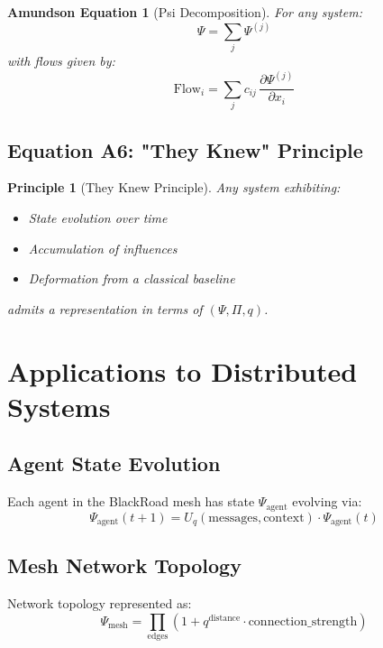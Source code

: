 \documentclass[12pt,a4paper]{article}
\newtheorem{principle}{Principle}
\newtheorem{equation_amundson}{Amundson Equation}
\begin{document}
\begin{equation_amundson}[Psi Decomposition]
For any system:
\begin{equation}\label{eq:a5}
\Psi = \sum_{j} \Psi^{(j)}
\end{equation}
with flows given by:
\begin{equation}
\text{Flow}_i = \sum_j c_{ij}\, \frac{\partial \Psi^{(j)}}{\partial x_i}
\end{equation}
\end{equation_amundson}

\subsection{Equation A6: "They Knew" Principle}

\begin{principle}[They Knew Principle]
Any system exhibiting:
\begin{itemize}
\item State evolution over time
\item Accumulation of influences
\item Deformation from a classical baseline
\end{itemize}
admits a representation in terms of $(\Psi, \Pi, q)$.
\end{principle}

\section{Applications to Distributed Systems}

\subsection{Agent State Evolution}

Each agent in the BlackRoad mesh has state $\Psi_{\text{agent}}$ evolving via:
\begin{equation}
\Psi_{\text{agent}}(t+1) = U_q(\text{messages}, \text{context}) \cdot \Psi_{\text{agent}}(t)
\end{equation}

\subsection{Mesh Network Topology}

Network topology represented as:
\begin{equation}
\Psi_{\text{mesh}} = \prod_{\text{edges}} \left(1 + q^{\text{distance}} \cdot \text{connection\_strength}\right)
\end{equation}
\end{document}
